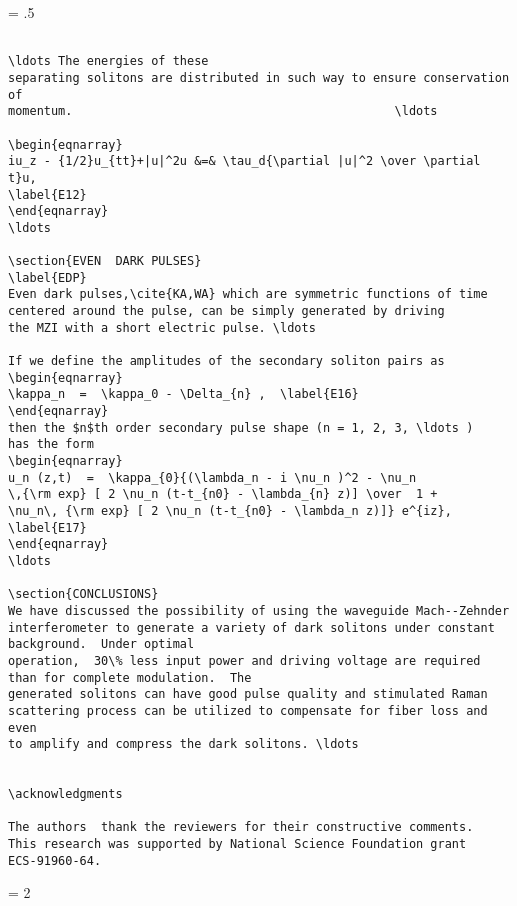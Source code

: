 \newpage
\baselineskip = .5\baselineskip  %
\begin{verbatim}

\ldots The energies of these
separating solitons are distributed in such way to ensure conservation of
momentum.                                             \ldots

\begin{eqnarray}
iu_z - {1/2}u_{tt}+|u|^2u &=& \tau_d{\partial |u|^2 \over \partial t}u,
\label{E12}
\end{eqnarray}
\ldots

\section{EVEN  DARK PULSES}
\label{EDP}
Even dark pulses,\cite{KA,WA} which are symmetric functions of time
centered around the pulse, can be simply generated by driving
the MZI with a short electric pulse. \ldots

If we define the amplitudes of the secondary soliton pairs as
\begin{eqnarray}
\kappa_n  =  \kappa_0 - \Delta_{n} ,  \label{E16}
\end{eqnarray}
then the $n$th order secondary pulse shape (n = 1, 2, 3, \ldots )
has the form
\begin{eqnarray}
u_n (z,t)  =  \kappa_{0}{(\lambda_n - i \nu_n )^2 - \nu_n
\,{\rm exp} [ 2 \nu_n (t-t_{n0} - \lambda_{n} z)] \over  1 +
\nu_n\, {\rm exp} [ 2 \nu_n (t-t_{n0} - \lambda_n z)]} e^{iz},
\label{E17}
\end{eqnarray}
\ldots

\section{CONCLUSIONS}
We have discussed the possibility of using the waveguide Mach--Zehnder
interferometer to generate a variety of dark solitons under constant
background.  Under optimal
operation,  30\% less input power and driving voltage are required
than for complete modulation.  The
generated solitons can have good pulse quality and stimulated Raman
scattering process can be utilized to compensate for fiber loss and even
to amplify and compress the dark solitons. \ldots


\acknowledgments

The authors  thank the reviewers for their constructive comments.
This research was supported by National Science Foundation grant
ECS-91960-64.

\end{verbatim}
\newpage
\baselineskip = 2\baselineskip  %

